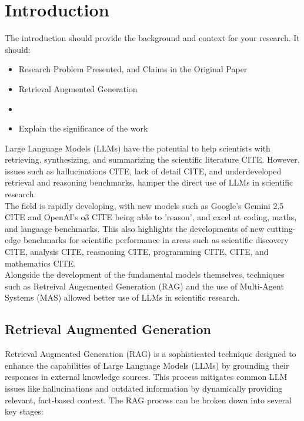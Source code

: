 \section{Introduction}
\label{sec:introduction}
The introduction should provide the background and context for your research. It should:
\begin{itemize}
    \item Research Problem Presented, and Claims in the Original Paper
    \item Retrieval Augmented Generation
    \item 
    \item Explain the significance of the work
\end{itemize}

Large Language Models (LLMs) have the potential to help scientists with retrieving, synthesizing, and summarizing the scientific literature CITE. 
However, issues such as hallucinations CITE, lack of detail CITE, and underdeveloped retrieval and reasoning benchmarks, hamper the direct use of LLMs in scientific research. \\

The field is rapidly developing, with new models such as Google's Gemini 2.5 CITE and OpenAI's o3 CITE being able to 'reason', and excel at coding, maths, and langaage benchmarks. 
This also highlights the developments of new cutting-edge benchmarks for scientific performance in areas such as scientific discovery CITE, analysis CITE, reasnoning CITE, programming CITE,
CITE, and mathematics CITE. \\

Alongside the development of the fundamental models themselves, techniques such as Retreival Augemented Generation (RAG) and the use of Multi-Agent Systems (MAS) allowed better use of LLMs in scientific research. \\

\subsection{Retrieval Augmented Generation}
Retrieval Augmented Generation (RAG) is a sophisticated technique designed to enhance the capabilities of Large Language Models (LLMs) by grounding their responses in external knowledge sources. This process mitigates common LLM issues like hallucinations and outdated information by dynamically providing relevant, fact-based context. The RAG process can be broken down into several key stages:

